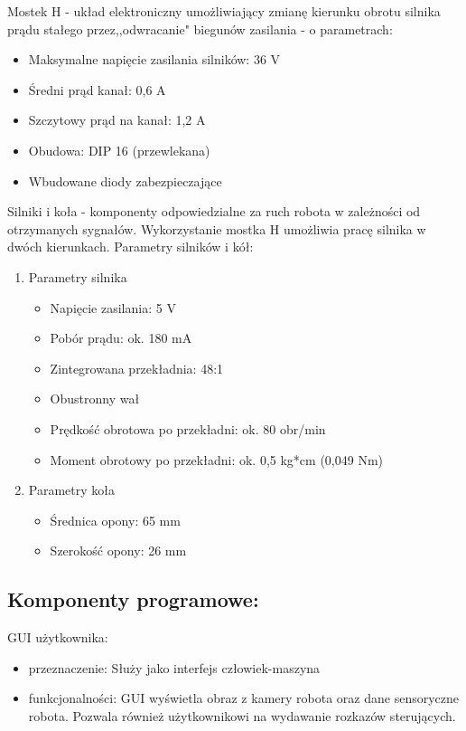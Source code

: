 \documentclass[a4paper]{article}
\begin{document}
Mostek H - układ elektroniczny umożliwiający zmianę kierunku obrotu silnika prądu stałego przez,,odwracanie" biegunów zasilania - o parametrach:
\begin{itemize}
\item Maksymalne napięcie zasilania silników: 36 V
\item Średni prąd kanał: 0,6 A
\item Szczytowy prąd na kanał: 1,2 A
\item Obudowa: DIP 16 (przewlekana)
\item Wbudowane diody zabezpieczające
\end{itemize}
Silniki i koła - komponenty odpowiedzialne za ruch robota w zależności od otrzymanych sygnałów.
Wykorzystanie mostka H umożliwia pracę silnika w dwóch kierunkach. Parametry silników i kół:

\begin{enumerate}
\item Parametry silnika
\begin{itemize}
\item Napięcie zasilania: 5 V
\item Pobór prądu: ok. 180 mA
\item Zintegrowana przekładnia: 48:1
\item Obustronny wał
\item Prędkość obrotowa po przekładni: ok. 80 obr/min
\item Moment obrotowy po przekładni: ok. 0,5 kg*cm (0,049 Nm)
\end{itemize}

\item Parametry koła
\begin{itemize}
\item Średnica opony: 65 mm
\item Szerokość opony: 26 mm
\end{itemize}
\end{enumerate}

\subsection{Komponenty programowe:}
GUI użytkownika:
\begin{itemize}
\item przeznaczenie: Służy jako interfejs człowiek-maszyna
\item funkcjonalności: GUI wyświetla obraz z kamery robota oraz dane sensoryczne robota. Pozwala również użytkownikowi na wydawanie rozkazów sterujących. 
\end{itemize}
\end{document}
